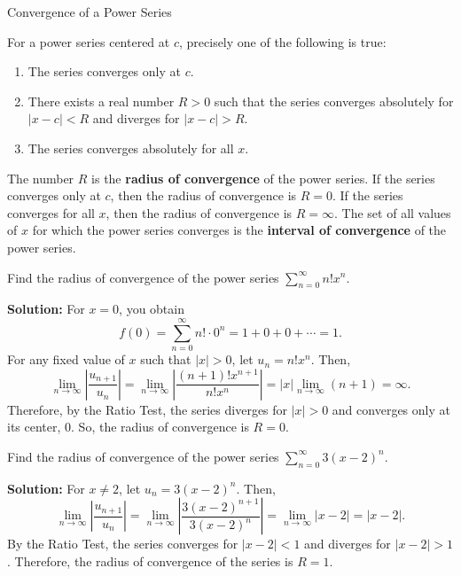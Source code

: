 \documentclass[12pt]{article}
\theoremstyle{beautifulthm}
\begin{document}
\begin{mytheorem}{Convergence of a Power Series}{}

For a power series centered at $c$, precisely one of the following is true:

\begin{enumerate}
    \item The series converges only at $c$.
    \item There exists a real number $R > 0$ such that the series converges absolutely for $\lvert x - c \rvert < R$ and diverges for $\lvert x - c \rvert > R$.
    \item The series converges absolutely for all $x$.
\end{enumerate}

The number $R$ is the \textbf{radius of convergence} of the power series. If the series converges only at $c$, then the radius of convergence is $R = 0$. If the series converges for all $x$, then the radius of convergence is $R = \infty$. The set of all values of $x$ for which the power series converges is the \textbf{interval of convergence} of the power series.
    
\end{mytheorem}


\begin{tcolorbox}[colback=examplebg, colframe=red!75!black, title=\textbf{EXAMPLE 2:Finding the Radius of Convergence}, fonttitle=\bfseries, sharp corners]

Find the radius of convergence of the power series $\sum_{n=0}^{\infty} n! x^n$.

\tcblower
\textbf{Solution:} 
For $x = 0$, you obtain
\[
f(0) = \sum_{n=0}^{\infty} n! \cdot 0^n = 1 + 0 + 0 + \cdots = 1.
\]
For any fixed value of $x$ such that $|x| > 0$, let $u_n = n! x^n$. Then,
\[
\lim_{n \to \infty} \left| \frac{u_{n+1}}{u_n} \right| = \lim_{n \to \infty} \left| \frac{(n+1)! x^{n+1}}{n! x^n} \right| = |x| \lim_{n \to \infty} (n+1) = \infty.
\]
Therefore, by the Ratio Test, the series diverges for $|x| > 0$ and converges only at its center, $0$. So, the radius of convergence is $R = 0$.
\end{tcolorbox}









\begin{tcolorbox}[colback=examplebg, colframe=red!75!black, title=\textbf{EXAMPLE 3: Finding the Radius of Convergence}, fonttitle=\bfseries, sharp corners]

Find the radius of convergence of the power series $\sum_{n=0}^{\infty} 3(x-2)^n$.

\tcblower
\textbf{Solution:} 
For $x \neq 2$, let $u_n = 3(x-2)^n$. Then,
\[
\lim_{n \to \infty} \left| \frac{u_{n+1}}{u_n} \right| = \lim_{n \to \infty} \left| \frac{3(x-2)^{n+1}}{3(x-2)^n} \right| = \lim_{n \to \infty} |x-2| = |x-2|.
\]
By the Ratio Test, the series converges for $|x-2| < 1$ and diverges for $|x-2| > 1$. Therefore, the radius of convergence of the series is $R = 1$.
\end{tcolorbox}
\end{document}
